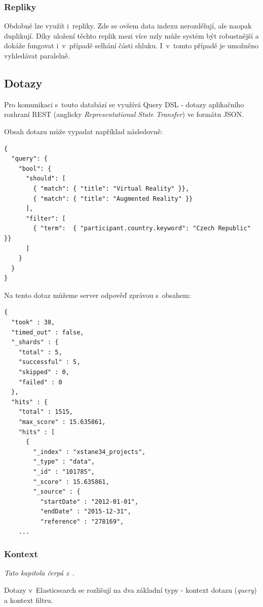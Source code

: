 \subsubsection*{Repliky}
Obdobně lze využít i~repliky. Zde se ovšem data indexu nerozdělují, ale naopak duplikují. Díky uložení těchto replik mezi více uzly může systém být robustnější a dokáže fungovat i~v~případě selhání části shluku. I~v~tomto případě je umožněno vyhledávat paralelně. 

\subsection{Dotazy}
Pro komunikaci s~touto databází se využívá Query DSL - dotazy aplikačního rozhraní REST (anglicky \emph{Representational State Transfer}) ve formátu JSON.

Obsah dotazu může vypadat například následovně:
\begin{verbatim}
{
  "query": { 
    "bool": { 
      "should": [
        { "match": { "title": "Virtual Reality" }}, 
        { "match": { "title": "Augmented Reality" }}  
      ],
      "filter": [ 
        { "term":  { "participant.country.keyword": "Czech Republic" }}
      ]
    }
  }
}
\end{verbatim}

\blindtext

Na tento dotaz můžeme server odpověď zprávou s~obsahem:

\begin{verbatim}
{
  "took" : 38,
  "timed_out" : false,
  "_shards" : {
    "total" : 5,
    "successful" : 5,
    "skipped" : 0,
    "failed" : 0
  },
  "hits" : {
    "total" : 1515,
    "max_score" : 15.635861,
    "hits" : [
      {
        "_index" : "xstane34_projects",
        "_type" : "data",
        "_id" : "101785",
        "_score" : 15.635861,
        "_source" : {
          "startDate" : "2012-01-01",
          "endDate" : "2015-12-31",
          "reference" : "278169",
    ...
\end{verbatim}

\blindtext


\subsubsection*{Kontext}
\emph{Tato kapitola čerpá z~\cite{bib:elastic-context}}.

Dotazy v~Elasticsearch se rozlišují na dva základní typy - kontext dotazu (\emph{query}) a kontext filtru.

